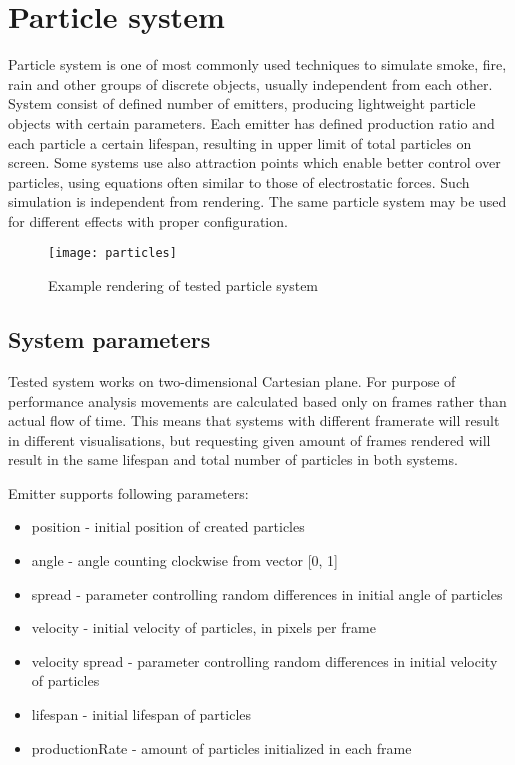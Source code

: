 \chapter{Particle system}
\label{cha:particlesystem}

Particle system is one of most commonly used techniques to simulate smoke, fire, rain and other groups of discrete objects, usually independent from each other. System consist of defined number of emitters, producing lightweight particle objects with certain parameters. Each emitter has defined production ratio and each particle a certain lifespan, resulting in upper limit of total particles on screen. Some systems use also attraction points which enable better control over particles, using equations often similar to those of electrostatic forces.
Such simulation is independent from rendering. The same particle system may be used for different effects with proper configuration.

\begin{figure}[h!]
  \caption{Example rendering of tested particle system}
  \label{img:particles}
  \centering
	\texttt{[image: particles]}
\end{figure}

\section{System parameters}
\label{sec:emittersparameters}

Tested system works on two-dimensional Cartesian plane. For purpose of  performance analysis movements are calculated based only on frames rather than actual flow of time. This means that systems with different framerate will result in different visualisations, but requesting given amount of frames rendered will result in the same lifespan and total number of particles in both systems.

Emitter supports following parameters:

\begin{itemize}
	\item position - initial position of created particles
	\item angle - angle counting clockwise from vector [0, 1]
	\item spread - parameter controlling random differences in initial angle of particles
	\item velocity - initial velocity of particles, in pixels per frame
	\item velocity spread - parameter controlling random differences in initial velocity of particles
	\item lifespan - initial lifespan of particles
	\item productionRate - amount of particles initialized in each frame
\end{itemize}

